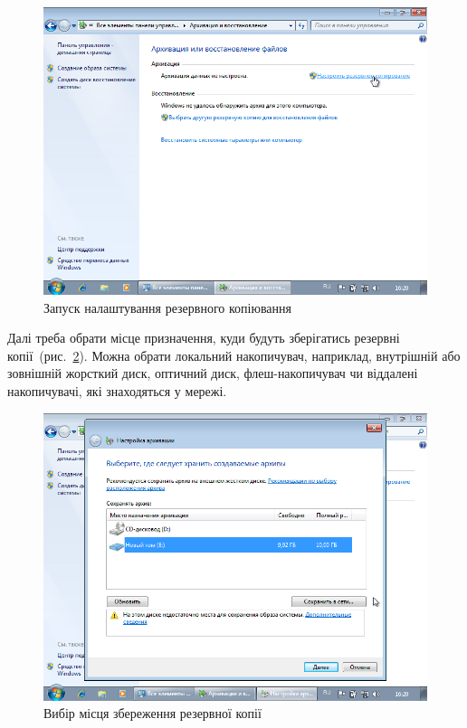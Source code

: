 \documentclass[
	a4paper,
	oneside,
	BCOR = 10mm,
	DIV = 12,
	12pt,
	headings = normal,
]{scrartcl}
\begin{document}
				\begin{figure}[!htbp]
					\centering
					\includegraphics[height=11\baselineskip]{./assets/y04s01-infosec-lab-01-03-p01.png}
					\caption{Запуск налаштування резервного копіювання}
					\label{fig:01-archivation-01}
				\end{figure}

				Далі треба обрати місце призначення, куди будуть зберігатись резервні копії~(рис.~\ref{fig:01-archivation-02}). Можна обрати локальний накопичувач, наприклад, внутрішній або зовнішній жорсткий диск, оптичний диск, флеш-накопичувач чи віддалені накопичувачі, які знаходяться у мережі.

				\begin{figure}[!htbp]
					\centering
					\includegraphics[height=12\baselineskip]{./assets/y04s01-infosec-lab-01-03-p02.png}
					\caption{Вибір місця збереження резервної копії}
					\label{fig:01-archivation-02}
				\end{figure}
\end{document}
